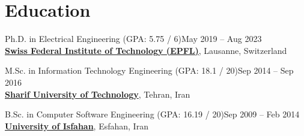 \documentclass[11pt]{article}
\begin{document}
\maketitle




\section{Education}
\begin{outerlist}

	\item Ph.D. in Electrical Engineering (GPA: 5.75 / 6)\hfill {May 2019 -- Aug 2023}\\
	\href{https://www.epfl.ch/en/home/}{\textbf{Swiss Federal Institute of Technology (EPFL)}}, Lausanne, Switzerland

	\item M.Sc. in Information Technology Engineering (GPA: 18.1 / 20)\hfill {Sep 2014 -- Sep 2016}\\
	\href{http://en.sharif.edu/}{\textbf{Sharif University of Technology}}, Tehran, Iran 

	\item B.Sc. in Computer Software Engineering (GPA: 16.19 / 20)\hfill {Sep 2009 -- Feb 2014}\\
	\href{http://ui.ac.ir/EN}{\textbf{University of Isfahan}}, Esfahan, Iran 

\end{outerlist}
\end{document}
